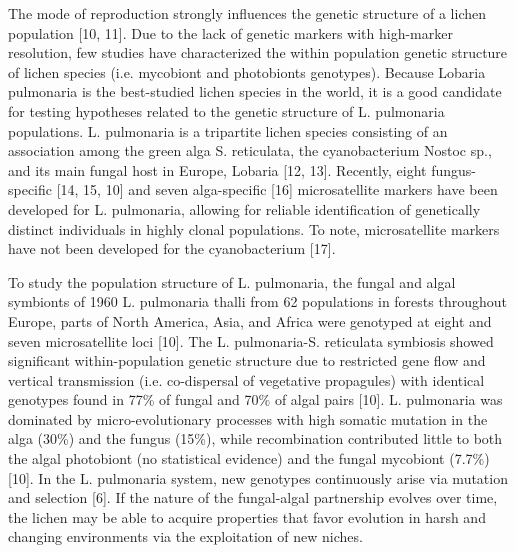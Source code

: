 The mode of reproduction strongly influences the genetic structure of a lichen population [10, 11]. Due to the lack of genetic markers with high-marker resolution, few studies have characterized the within population genetic structure of lichen species (i.e. mycobiont and photobionts genotypes). Because Lobaria pulmonaria is the best-studied lichen species in the world, it is a good candidate for testing hypotheses related to the genetic structure of L. pulmonaria  populations. L. pulmonaria is a tripartite lichen species consisting of an association among the green alga S. reticulata, the cyanobacterium Nostoc sp., and its main fungal host in Europe, Lobaria [12, 13]. Recently, eight fungus-specific [14, 15, 10] and seven alga-specific [16] microsatellite markers have been developed for L. pulmonaria, allowing for reliable identification of genetically distinct individuals in highly clonal populations. To note, microsatellite markers have not been developed for the cyanobacterium [17]. 

To study the population structure of L. pulmonaria, the fungal and algal symbionts of 1960 L. pulmonaria thalli from 62 populations in forests throughout Europe, parts of North America, Asia, and Africa were genotyped at eight and seven microsatellite loci [10]. The L. pulmonaria-S. reticulata symbiosis showed significant within-population genetic structure due to restricted gene flow and vertical transmission (i.e. co-dispersal of vegetative propagules) with identical genotypes found in 77\% of fungal and 70\% of algal pairs [10]. L. pulmonaria was dominated by micro-evolutionary processes with high somatic mutation in the alga (30\%) and the fungus (15\%), while recombination contributed little to both the algal photobiont (no statistical evidence) and the fungal mycobiont (7.7\%) [10]. In the L. pulmonaria system, new genotypes continuously arise via mutation and selection [6]. If the nature of the fungal-algal partnership evolves over time, the lichen may be able to acquire properties that favor evolution in harsh and changing environments via the exploitation of new niches.

